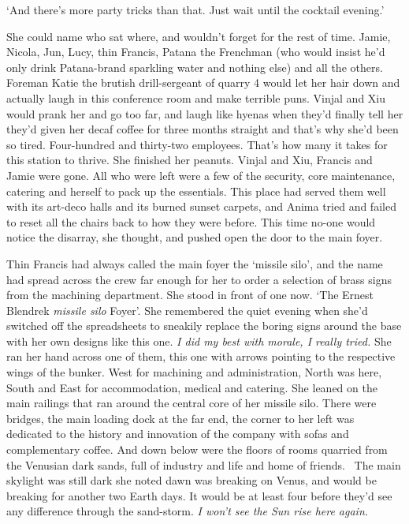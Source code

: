 `And there's more party tricks than that. Just wait until the cocktail
evening.'

She could name who sat where, and wouldn't forget for the rest of
time. Jamie, Nicola, Jun, Lucy, thin Francis, Patana the Frenchman
(who would insist he'd only drink Patana-brand sparkling water and
nothing else) and all the others. Foreman Katie the brutish
drill-sergeant of quarry 4 would let her hair down and actually laugh
in this conference room and make terrible puns. Vinjal and Xiu would
prank her and go too far, and laugh like hyenas when they'd finally
tell her they'd given her decaf coffee for three months straight and
that's why she'd been so tired. Four-hundred and thirty-two
employees. That's how many it takes for this station to thrive. She
finished her peanuts. Vinjal and Xiu, Francis and Jamie were gone. All
who were left were a few of the security, core maintenance, catering
and herself to pack up the essentials. This place had served them well
with its art-deco halls and its burned sunset carpets, and Anima tried
and failed to reset all the chairs back to how they were before. This
time no-one would notice the disarray, she thought, and pushed open
the door to the main foyer.

Thin Francis had always called the main foyer the ‘missile silo', and
the name had spread across the crew far enough for her to order a
selection of brass signs from the machining department. She stood in
front of one now. ‘The Ernest Blendrek \textit{missile silo}
Foyer'. She remembered the quiet evening when she'd switched off the
spreadsheets to sneakily replace the boring signs around the base with
her own designs like this one. \textit{I did my best with morale, I
 really tried.} She ran her hand across one of them, this one with
arrows pointing to the respective wings of the bunker. West for
machining and administration, North was here, South and East for
accommodation, medical and catering. She leaned on the main railings
that ran around the central core of her missile silo. There were
bridges, the main loading dock at the far end, the corner to her left
was dedicated to the history and innovation of the company with sofas
and complementary coffee. And down below were the floors of rooms
quarried from the Venusian dark sands, full of industry and life and
home of friends.  The main skylight was still dark she noted
\textemdash{} dawn was breaking on Venus, and would be breaking for
another two Earth days. It would be at least four before they'd see
any difference through the sand-storm. \textit{I won't see the Sun
 rise here again.}

